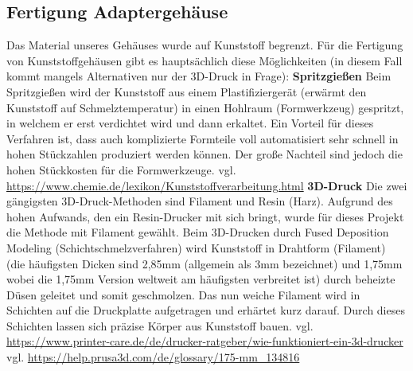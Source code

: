 \documentclass[11pt, twoside]{article}
\begin{document}
\subsection{Fertigung Adaptergehäuse}
Das Material unseres Gehäuses wurde auf Kunststoff begrenzt. Für die Fertigung von Kunststoffgehäusen gibt es hauptsächlich diese Möglichkeiten (in diesem Fall kommt mangels Alternativen nur der 3D-Druck in Frage): 
\vspace{4mm}\newline
\textbf{Spritzgießen} \newline
\glqq Beim Spritzgießen wird der Kunststoff aus einem Plastifiziergerät (erwärmt den Kunststoff auf Schmelztemperatur) in einen Hohlraum (Formwerkzeug) gespritzt, in welchem er erst verdichtet wird und dann erkaltet.\grqq \newline 
Ein Vorteil für dieses Verfahren ist, dass auch komplizierte Formteile voll automatisiert sehr schnell in hohen Stückzahlen produziert werden können.
Der große Nachteil sind jedoch die hohen Stückkosten für die Formwerkzeuge.\vspace{4mm}\newline 
vgl. \url{https://www.chemie.de/lexikon/Kunststoffverarbeitung.html}
\vspace{4mm}\newline
\textbf{3D-Druck} \newline
Die zwei gängigsten 3D-Druck-Methoden sind Filament und Resin (Harz). Aufgrund des hohen Aufwands, den ein Resin-Drucker mit sich bringt, wurde für dieses Projekt die Methode mit Filament gewählt. \newline
Beim 3D-Drucken durch Fused Deposition Modeling (Schichtschmelzverfahren) wird Kunststoff in Drahtform (Filament) (die häufigsten Dicken sind 2,85mm (allgemein als 3mm bezeichnet) und 1,75mm wobei die 1,75mm Version weltweit am häufigsten verbreitet ist) durch beheizte Düsen geleitet und somit geschmolzen. Das nun weiche Filament wird in Schichten auf die Druckplatte aufgetragen und erhärtet kurz darauf. Durch dieses Schichten lassen sich präzise Körper aus Kunststoff bauen.
\vspace{4mm}\newline
vgl. \url{https://www.printer-care.de/de/drucker-ratgeber/wie-funktioniert-ein-3d-drucker}\newline
vgl. \url{https://help.prusa3d.com/de/glossary/175-mm_134816}
\end{document}
